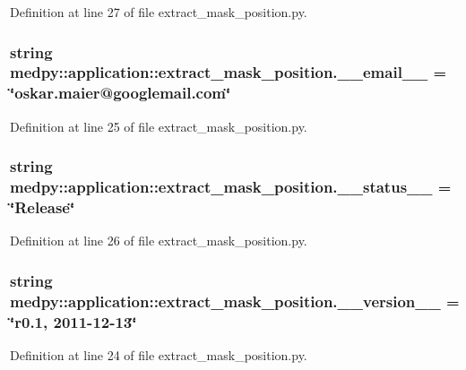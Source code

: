 Definition at line 27 of file extract\_\-mask\_\-position.py.

\hypertarget{namespacemedpy_1_1application_1_1extract__mask__position_a988104fed2bdcdf91654440be293a898}{
\subsubsection[{\_\-\_\-email\_\-\_\-}]{\setlength{\rightskip}{0pt plus 5cm}string {\bf medpy::application::extract\_\-mask\_\-position.\_\-\_\-email\_\-\_\-} = \char`\"{}oskar.maier@googlemail.com\char`\"{}}}
\label{namespacemedpy_1_1application_1_1extract__mask__position_a988104fed2bdcdf91654440be293a898}


Definition at line 25 of file extract\_\-mask\_\-position.py.

\hypertarget{namespacemedpy_1_1application_1_1extract__mask__position_a25001c0b8b158a353365ad9b3728b17b}{
\subsubsection[{\_\-\_\-status\_\-\_\-}]{\setlength{\rightskip}{0pt plus 5cm}string {\bf medpy::application::extract\_\-mask\_\-position.\_\-\_\-status\_\-\_\-} = \char`\"{}Release\char`\"{}}}
\label{namespacemedpy_1_1application_1_1extract__mask__position_a25001c0b8b158a353365ad9b3728b17b}


Definition at line 26 of file extract\_\-mask\_\-position.py.

\hypertarget{namespacemedpy_1_1application_1_1extract__mask__position_a6438d861bc2f95505e058add33e655da}{
\subsubsection[{\_\-\_\-version\_\-\_\-}]{\setlength{\rightskip}{0pt plus 5cm}string {\bf medpy::application::extract\_\-mask\_\-position.\_\-\_\-version\_\-\_\-} = \char`\"{}r0.1, 2011-\/12-\/13\char`\"{}}}
\label{namespacemedpy_1_1application_1_1extract__mask__position_a6438d861bc2f95505e058add33e655da}


Definition at line 24 of file extract\_\-mask\_\-position.py.

